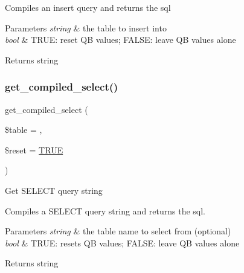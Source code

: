 Compiles an insert query and returns the sql


\begin{DoxyParams}{Parameters}
{\em string} & the table to insert into \\
\hline
{\em bool} & T\+R\+UE\+: reset QB values; F\+A\+L\+SE\+: leave QB values alone \\
\hline
\end{DoxyParams}
\begin{DoxyReturn}{Returns}
string 
\end{DoxyReturn}
\mbox{\label{class_c_i___d_b__query__builder_a23325dd8908b76e716e430b4968e3987}} 
\subsubsection{\texorpdfstring{get\+\_\+compiled\+\_\+select()}{get\_compiled\_select()}}
{\footnotesize\ttfamily get\+\_\+compiled\+\_\+select (\begin{DoxyParamCaption}\item[{}]{\$table = {\ttfamily \textquotesingle{}\textquotesingle{}},  }\item[{}]{\$reset = {\ttfamily \mbox{\hyperlink{constants_8php_ae04a3efe6aa42044f803ee90c2277846}{T\+R\+UE}}} }\end{DoxyParamCaption})}

Get S\+E\+L\+E\+CT query string

Compiles a S\+E\+L\+E\+CT query string and returns the sql.


\begin{DoxyParams}{Parameters}
{\em string} & the table name to select from (optional) \\
\hline
{\em bool} & T\+R\+UE\+: resets QB values; F\+A\+L\+SE\+: leave QB values alone \\
\hline
\end{DoxyParams}
\begin{DoxyReturn}{Returns}
string 
\end{DoxyReturn}
\mbox{\label{class_c_i___d_b__query__builder_a77fb150224714405067df7c300c317b0}} 
